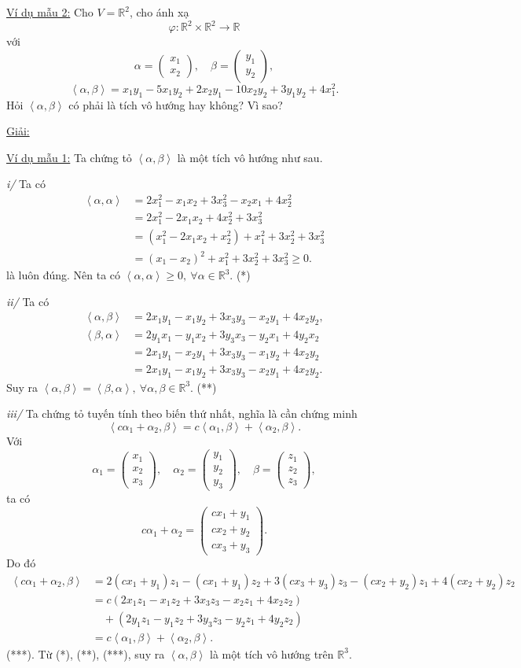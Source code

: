 \documentclass[12pt,a4paper]{article}
\newcommand{\R}{\mathbb{R}}
\newcommand{\ip}[2]{\left\langle #1,#2\right\rangle}
\newcommand{\vect}[1]{\begin{pmatrix}#1\end{pmatrix}}
\begin{document}
\underline{Ví dụ mẫu 2:} Cho $V=\R^2$, cho ánh xạ
\[
\varphi:\R^2\times\R^2\to\R
\]
với
\[
\alpha=\vect{x_1\\x_2},\quad \beta=\vect{y_1\\y_2},
\]
\[
\ip{\alpha}{\beta}=x_1y_1-5x_1y_2+2x_2y_1-10x_2y_2+3y_1y_2+4x_1^2.
\]
Hỏi $\ip{\alpha}{\beta}$ có phải là tích vô hướng hay không? Vì sao?

\underline{Giải:}

\underline{Ví dụ mẫu 1:} Ta chứng tỏ $\ip{\alpha}{\beta}$ là một tích vô hướng như sau.

\textit{i/} Ta có
\[
\begin{aligned}
\ip{\alpha}{\alpha}
&=2x_1^2-x_1x_2+3x_3^2-x_2x_1+4x_2^2\\
&=2x_1^2-2x_1x_2+4x_2^2+3x_3^2\\
&=(x_1^2-2x_1x_2+x_2^2)+x_1^2+3x_2^2+3x_3^2\\
&=(x_1-x_2)^2+x_1^2+3x_2^2+3x_3^2\ge0.
\end{aligned}
\]
là luôn đúng. Nên ta có $\ip{\alpha}{\alpha}\ge0,\ \forall\alpha\in\R^3$. (*)

\textit{ii/} Ta có
\[
\begin{aligned}
\ip{\alpha}{\beta}
&=2x_1y_1-x_1y_2+3x_3y_3-x_2y_1+4x_2y_2,
\\
\ip{\beta}{\alpha}
&=2y_1x_1-y_1x_2+3y_3x_3-y_2x_1+4y_2x_2\\
&=2x_1y_1-x_2y_1+3x_3y_3-x_1y_2+4x_2y_2\\
&=2x_1y_1-x_1y_2+3x_3y_3-x_2y_1+4x_2y_2.
\end{aligned}
\]
Suy ra $\ip{\alpha}{\beta}=\ip{\beta}{\alpha},\ \forall\alpha,\beta\in\R^3$. (**)

\textit{iii/} Ta chứng tỏ tuyến tính theo biến thứ nhất, nghĩa là cần chứng minh
\[
\ip{c\alpha_1+\alpha_2}{\beta}=c\ip{\alpha_1}{\beta}+\ip{\alpha_2}{\beta}.
\]
Với
\[
\alpha_1=\vect{x_1\\x_2\\x_3},\quad
\alpha_2=\vect{y_1\\y_2\\y_3},\quad
\beta=\vect{z_1\\z_2\\z_3},
\]
ta có
\[
c\alpha_1+\alpha_2=\vect{cx_1+y_1\\cx_2+y_2\\cx_3+y_3}.
\]
Do đó
\[
\begin{aligned}
\ip{c\alpha_1+\alpha_2}{\beta}
&=2(cx_1+y_1)z_1-(cx_1+y_1)z_2+3(cx_3+y_3)z_3-(cx_2+y_2)z_1+4(cx_2+y_2)z_2\\
&=c(2x_1z_1-x_1z_2+3x_3z_3-x_2z_1+4x_2z_2)\\
&\quad +(2y_1z_1-y_1z_2+3y_3z_3-y_2z_1+4y_2z_2)\\
&=c\ip{\alpha_1}{\beta}+\ip{\alpha_2}{\beta}.
\end{aligned}
\]
(***). Từ (*), (**), (***), suy ra $\ip{\alpha}{\beta}$ là một tích vô hướng trên $\R^3$.
\end{document}
